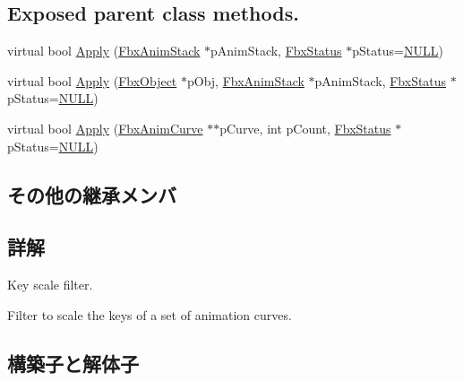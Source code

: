 \subsection*{Exposed parent class methods.}
\begin{DoxyCompactItemize}
\item 
virtual bool \hyperlink{class_fbx_anim_curve_filter_scale_ac6fb7610299bd0fc1e399418f8d17b90}{Apply} (\hyperlink{class_fbx_anim_stack}{Fbx\+Anim\+Stack} $\ast$p\+Anim\+Stack, \hyperlink{class_fbx_status}{Fbx\+Status} $\ast$p\+Status=\hyperlink{fbxarch_8h_a070d2ce7b6bb7e5c05602aa8c308d0c4}{N\+U\+LL})
\item 
virtual bool \hyperlink{class_fbx_anim_curve_filter_scale_acaecc7335471ad618e0cc7e02625dbec}{Apply} (\hyperlink{class_fbx_object}{Fbx\+Object} $\ast$p\+Obj, \hyperlink{class_fbx_anim_stack}{Fbx\+Anim\+Stack} $\ast$p\+Anim\+Stack, \hyperlink{class_fbx_status}{Fbx\+Status} $\ast$p\+Status=\hyperlink{fbxarch_8h_a070d2ce7b6bb7e5c05602aa8c308d0c4}{N\+U\+LL})
\item 
virtual bool \hyperlink{class_fbx_anim_curve_filter_scale_a2bf27f4195e038cd2d6308a3399ab556}{Apply} (\hyperlink{class_fbx_anim_curve}{Fbx\+Anim\+Curve} $\ast$$\ast$p\+Curve, int p\+Count, \hyperlink{class_fbx_status}{Fbx\+Status} $\ast$p\+Status=\hyperlink{fbxarch_8h_a070d2ce7b6bb7e5c05602aa8c308d0c4}{N\+U\+LL})
\end{DoxyCompactItemize}
\subsection*{その他の継承メンバ}


\subsection{詳解}
Key scale filter.

Filter to scale the keys of a set of animation curves. 

\subsection{構築子と解体子}
\mbox{\label{class_fbx_anim_curve_filter_scale_a8ac5600b1b34f191cb4cab040d9d2ef9}} 
